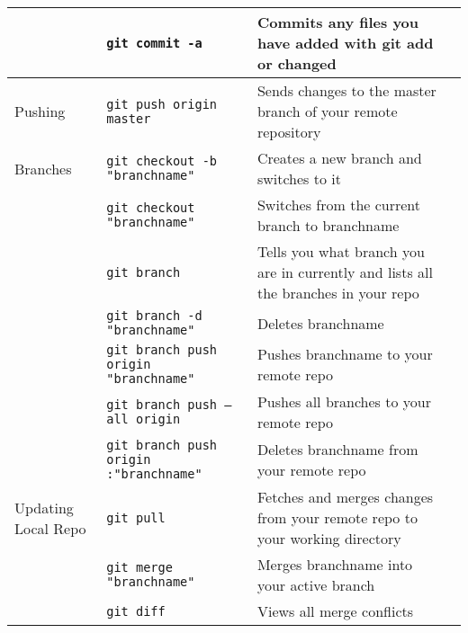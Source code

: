 \documentclass[11pt, letterpaper]{article}
\begin{document}
\begin{table}[!htb]
\begin{center}
\begin{tabular}{p{2cm} l p{4cm} l}
					& \texttt{git commit -a} & Commits any files you have added with git add or changed \\

					\midrule
					Pushing

					& \texttt{git push origin master} & Sends changes to the master branch of your remote repository \\

					\midrule
					Branches

					& \texttt{git checkout -b "branchname"} & Creates a new branch and switches to it \\\cmidrule{2-3}

					& \texttt{git checkout "branchname"} & Switches from the current branch to branchname \\\cmidrule{2-3}

					& \texttt{git branch} & Tells you what branch you are in currently and lists all the branches in your repo \\\cmidrule{2-3}

					& \texttt{git branch -d "branchname"} & Deletes branchname \\\cmidrule{2-3}

					& \texttt{git branch push origin "branchname"} & Pushes branchname to your remote repo \\\cmidrule{2-3}

					& \texttt{git branch push --all origin} & Pushes all branches to your remote repo \\\cmidrule{2-3}

					& \texttt{git branch push origin :"branchname"} & Deletes branchname from your remote repo \\

					\midrule
					Updating Local Repo

					& \texttt{git pull} & Fetches and merges changes from your remote repo to your working directory \\\cmidrule{2-3}
					
					& \texttt{git merge "branchname"} & Merges branchname into your active branch \\\cmidrule{2-3}

					& \texttt{git diff} & Views all merge conflicts \\

					\bottomrule
				\end{tabular}
			\end{center}
		\end{table}
\end{document}
